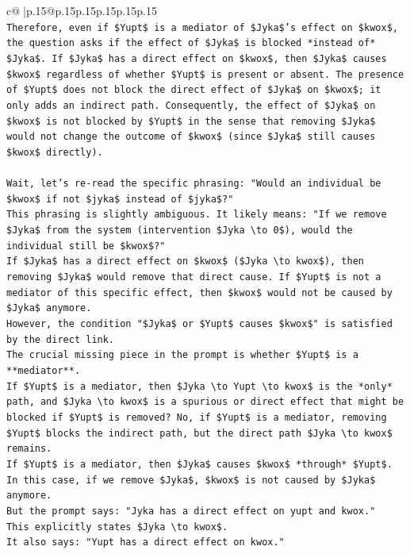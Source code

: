 \documentclass{article}
\begin{document}
{\begin{supertabular}{c@{$\;$}|p{.15\linewidth}@{}p{.15\linewidth}p{.15\linewidth}p{.15\linewidth}p{.15\linewidth}p{.15\linewidth}}
{{{\\ 
\texttt{Therefore, even if \$Yupt\$ is a mediator of \$Jyka\$'s effect on \$kwox\$, the question asks if the effect of \$Jyka\$ is blocked *instead of* \$Jyka\$. If \$Jyka\$ has a direct effect on \$kwox\$, then \$Jyka\$ causes \$kwox\$ regardless of whether \$Yupt\$ is present or absent. The presence of \$Yupt\$ does not block the direct effect of \$Jyka\$ on \$kwox\$; it only adds an indirect path. Consequently, the effect of \$Jyka\$ on \$kwox\$ is not blocked by \$Yupt\$ in the sense that removing \$Jyka\$ would not change the outcome of \$kwox\$ (since \$Jyka\$ still causes \$kwox\$ directly).} \\
\\ 
\texttt{Wait, let's re{-}read the specific phrasing: "Would an individual be \$kwox\$ if not \$jyka\$ instead of \$jyka\$?"} \\
\texttt{This phrasing is slightly ambiguous. It likely means: "If we remove \$Jyka\$ from the system (intervention \$Jyka \textbackslash{}to 0\$), would the individual still be \$kwox\$?"} \\
\texttt{If \$Jyka\$ has a direct effect on \$kwox\$ (\$Jyka \textbackslash{}to kwox\$), then removing \$Jyka\$ would remove that direct cause. If \$Yupt\$ is not a mediator of this specific effect, then \$kwox\$ would not be caused by \$Jyka\$ anymore.} \\
\texttt{However, the condition "\$Jyka\$ or \$Yupt\$ causes \$kwox\$" is satisfied by the direct link.} \\
\texttt{The crucial missing piece in the prompt is whether \$Yupt\$ is a **mediator**.} \\
\texttt{If \$Yupt\$ is a mediator, then \$Jyka \textbackslash{}to Yupt \textbackslash{}to kwox\$ is the *only* path, and \$Jyka \textbackslash{}to kwox\$ is a spurious or direct effect that might be blocked if \$Yupt\$ is removed? No, if \$Yupt\$ is a mediator, removing \$Yupt\$ blocks the indirect path, but the direct path \$Jyka \textbackslash{}to kwox\$ remains.} \\
\texttt{If \$Yupt\$ is a mediator, then \$Jyka\$ causes \$kwox\$ *through* \$Yupt\$. In this case, if we remove \$Jyka\$, \$kwox\$ is not caused by \$Jyka\$ anymore.} \\
\texttt{But the prompt says: "Jyka has a direct effect on yupt and kwox."} \\
\texttt{This explicitly states \$Jyka \textbackslash{}to kwox\$.} \\
\texttt{It also says: "Yupt has a direct effect on kwox."} \\
}}}
\end{supertabular}}
\end{document}
